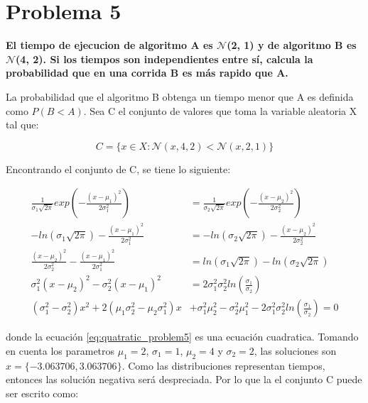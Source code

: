 \section*{Problema 5}

\textbf{
    El tiempo de ejecucion de algoritmo A es $\mathcal{N}$(2, 1) y de algoritmo B es $\mathcal{N}$(4, 2). Si los tiempos son independientes entre sí, calcula la probabilidad que en una corrida B es más rapido que A.
}

La probabilidad que el algoritmo B obtenga un tiempo menor que A es definida como $P(B<A)$. Sea C el conjunto de valores que toma la variable aleatoria X tal que:

\begin{equation*}
    C=\{x\in X : \mathcal{N}(x,4,2)<\mathcal{N}(x,2,1)\}
\end{equation*}

Encontrando el conjunto de C, se tiene lo siguiente:

\begin{align}
    \frac{1}{\sigma_1 \sqrt{2\pi}} exp\left(-\frac{(x-\mu_1)^2}{2\sigma_1^2}\right) & = \frac{1}{\sigma_2 \sqrt{2\pi}} exp\left(-\frac{(x-\mu_2)^2}{2\sigma_2^2}\right)                               \nonumber                     \\
    -ln\left(\sigma_1 \sqrt{2\pi}\right) -\frac{(x-\mu_1)^2}{2\sigma_1^2}           & = -ln\left(\sigma_2 \sqrt{2\pi}\right) -\frac{(x-\mu_2)^2}{2\sigma_2^2}                                         \nonumber                     \\
    \frac{(x-\mu_2)^2}{2\sigma_2^2} -\frac{(x-\mu_1)^2}{2\sigma_1^2}                & =ln\left(\sigma_1 \sqrt{2\pi}\right) - ln\left(\sigma_2 \sqrt{2\pi}\right)                                      \nonumber                     \\
    \sigma_1^2(x-\mu_2)^2 -\sigma_2^2(x-\mu_1)^2                                    & = 2 \sigma_1^2 \sigma_2^2 ln\left(\frac{\sigma_1}{\sigma_2}\right)                                              \nonumber                     \\
    (\sigma_1^2-\sigma_2^2) x^2 + 2(\mu_1\sigma_2^2-\mu_2\sigma_1^2) x              & + \sigma_1^2 \mu_2^2 - \sigma_2^2 \mu_1^2 - 2 \sigma_1^2 \sigma_2^2 ln\left(\frac{\sigma_1}{\sigma_2}\right) =0 \label{eq:quatratic_problem5}
\end{align}

donde la ecuación \ref{eq:quatratic_problem5} es una ecuación cuadratica. Tomando en cuenta los parametros $\mu_1=2$, $\sigma_1 = 1$, $\mu_2= 4$ y $\sigma_2=2$, las soluciones son $x=\{-3.063706,3.063706\}$. Como las distribuciones representan tiempos, entonces las solución negativa será despreciada. Por lo que la el conjunto C puede ser escrito como:


